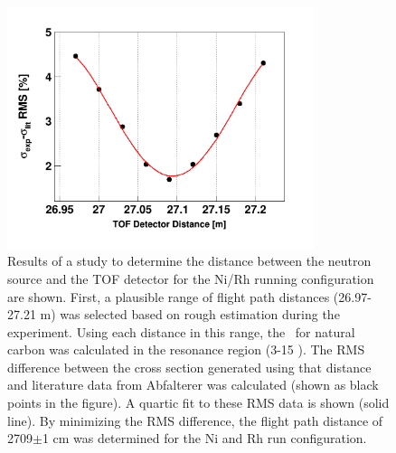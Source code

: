 \begin{figure}[tb]
    \centering
    \includegraphics[width=0.8\textwidth]{figures/DistanceStudyNi.png}
    \caption[Determining the time-of-flight detector distance using \cNat\ resonances]
    {Results of a study to determine the distance between
    the neutron source and the TOF detector for the Ni/Rh running configuration
are shown. First, a plausible range of flight path distances (26.97-27.21 m) was
selected based on rough estimation during the experiment. Using each
distance in this range, the \tot\ for natural carbon was calculated in the
resonance region (3-15 \mega\electronvolt). The RMS difference between the cross section
generated using that distance and literature data from Abfalterer
\cite{Abfalterer2000, Abfalterer2001} was calculated (shown as black points in
the figure). A quartic fit to these RMS data is shown (solid line). By minimizing the
RMS difference, the flight path distance of 2709$\pm$1 cm was determined for the
Ni and Rh run configuration.}
    \label{DistanceStudy}
\end{figure}

